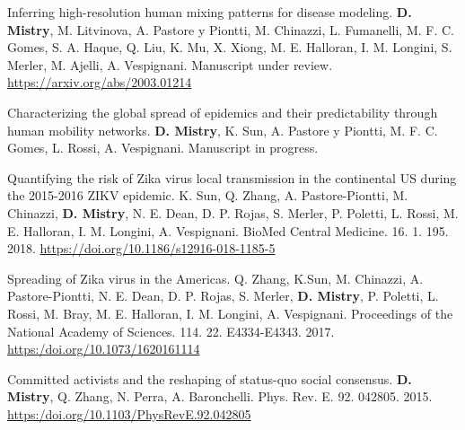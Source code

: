 \begin{cventries}
  \cvpublicationentry
    {Inferring high-resolution human mixing patterns for disease modeling.} %
    {\textbf{D. Mistry}, M. Litvinova, A. Pastore y Piontti, M. Chinazzi, L. Fumanelli, M. F. C. Gomes, S. A. Haque, Q. Liu, K. Mu, X. Xiong, M. E. Halloran, I. M. Longini, S. Merler, M. Ajelli, A. Vespignani.} %
    {} %
    {} %
    {} %
    {} %
    {} %
    {Manuscript under review.} %
    {\href{https://arxiv.org/abs/2003.01214}{https://arxiv.org/abs/2003.01214}} %
    \vspace{1.5mm}

  \cvpublicationentry
    {Characterizing the global spread of epidemics and their predictability through human mobility networks.} %
    {\textbf{D. Mistry}, K. Sun, A. Pastore y Piontti, M. F. C. Gomes, L. Rossi, A. Vespignani.} %
    {} %
    {} %
    {} %
    {} %
    {} %
    {Manuscript in progress.} %
    {} %
    \vspace{1.5mm}

  \cvpublicationentry
    {Quantifying the risk of Zika virus local transmission in the continental US during the 2015-2016 ZIKV epidemic.} %
    {K. Sun, Q. Zhang, A. Pastore-Piontti, M. Chinazzi, \textbf{D. Mistry}, N. E. Dean, D. P. Rojas, S. Merler, P. Poletti, L. Rossi, M. E. Halloran, I. M. Longini, A. Vespignani.} %
    {BioMed Central Medicine. } %
    { 16.} %
    { 1. } %
    { 195.} %
    {2018.} %
    {} %
    {\href{https://doi.org/10.1186/s12916-018-1185-5}{https://doi.org/10.1186/s12916-018-1185-5}} %
    \vspace{1.5mm}

  \cvpublicationentry
    {Spreading of Zika virus in the Americas.} %
    {Q. Zhang, K.Sun, M. Chinazzi, A. Pastore-Piontti, N. E. Dean, D. P. Rojas, S. Merler, \textbf{D. Mistry}, P. Poletti, L. Rossi, M. Bray, M. E. Halloran, I. M. Longini, A. Vespignani.} %
    {Proceedings of the National Academy of Sciences. } %
    { 114.} %
    { 22. } %
    {  E4334-E4343. } %
    { 2017.} %
    {} %
    {\href{https:/doi.org/10.1073/1620161114}{https:/doi.org/10.1073/1620161114}} %
    \vspace{1.5mm}

  \cvpublicationentry
    {Committed activists and the reshaping of status-quo social consensus.} %
    {\textbf{D. Mistry}, Q. Zhang, N. Perra, A. Baronchelli.} %
    {Phys. Rev. E.} %
    { 92.} %
    { } %
    {042805. } %
    { 2015.} %
    {} %
    {\href{https:/doi.org/10.1103/PhysRevE.92.042805}{https:/doi.org/10.1103/PhysRevE.92.042805}} %
    \vspace{1.5mm}

\end{cventries}
